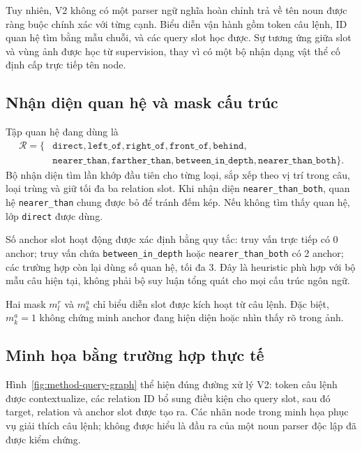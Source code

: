 Tuy nhiên, V2 không có một parser ngữ nghĩa hoàn chỉnh trả về tên noun
được ràng buộc chính xác với từng cạnh. Biểu diễn vận hành gồm token
câu lệnh, ID quan hệ tìm bằng mẫu chuỗi, và các query slot học được.
Sự tương ứng giữa slot và vùng ảnh được học từ supervision, thay vì
có một bộ nhận dạng vật thể cố định cấp trực tiếp tên node.

\subsection{Nhận diện quan hệ và mask cấu trúc}

Tập quan hệ đang dùng là
\begin{equation}
\begin{split}
    \mathcal{R}=\{&
    \texttt{direct},\texttt{left\_of},\texttt{right\_of},
    \texttt{front\_of},\texttt{behind},\\
    &\texttt{nearer\_than},\texttt{farther\_than},
    \texttt{between\_in\_depth},\texttt{nearer\_than\_both}\}.
\end{split}
\end{equation}
Bộ nhận diện tìm lần khớp đầu tiên cho từng loại, sắp xếp theo vị trí
trong câu, loại trùng và giữ tối đa ba relation slot. Khi nhận diện
\texttt{nearer\_than\_both}, quan hệ \texttt{nearer\_than} chung được bỏ
để tránh đếm kép. Nếu không tìm thấy quan hệ, lớp \texttt{direct}
được dùng.

Số anchor slot hoạt động được xác định bằng quy tắc: truy vấn trực
tiếp có 0 anchor; truy vấn chứa \texttt{between\_in\_depth} hoặc
\texttt{nearer\_than\_both} có 2 anchor; các trường hợp còn lại dùng
số quan hệ, tối đa 3. Đây là heuristic phù hợp với bộ mẫu câu hiện
tại, không phải bộ suy luận tổng quát cho mọi cấu trúc ngôn ngữ.

Hai mask $m_l^{r}$ và $m_k^{a}$ chỉ biểu diễn slot được kích hoạt
từ câu lệnh. Đặc biệt, $m_k^{a}=1$ không chứng minh anchor đang
hiện diện hoặc nhìn thấy rõ trong ảnh.

\subsection{Minh họa bằng trường hợp thực tế}

Hình~\ref{fig:method-query-graph} thể hiện đúng đường xử lý V2:
token câu lệnh được contextualize, các relation ID bổ sung điều kiện
cho query slot, sau đó target, relation và anchor slot được tạo ra.
Các nhãn node trong minh họa phục vụ giải thích câu lệnh; không được
hiểu là đầu ra của một noun parser độc lập đã được kiểm chứng.

